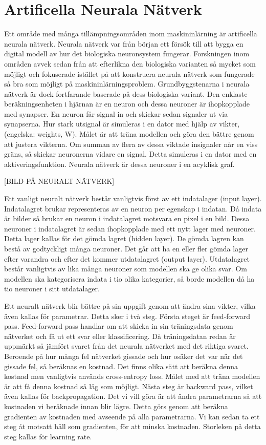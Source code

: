 \documentclass[]{kththesis}
\begin{document}
\section{Artificella Neurala Nätverk}
Ett område med många tillämpningsområden inom maskininlärning är artificella neurala nätverk. Neurala nätverk var från början ett försök till att bygga en digital modell av hur det biologiska neuronsystem fungerar. Forskningen inom områden avvek sedan från att efterlikna den biologiska varianten så mycket som möjligt och fokuserade istället på att konstruera neurala nätverk som fungerade så bra som möjligt på maskininlärningsproblem. Grundbyggstenarna i neurala nätverk är dock fortfarande baserade på dess biologiska variant. Den enklaste beräkningsenheten i hjärnan är en neuron och dessa neuroner är ihopkopplade med synapser. En neuron får signal in och skickar sedan signaler ut via synapserna. Hur stark utsignal är simuleras i en dator med hjälp av vikter, (engelska: weights, W). Målet är att träna modellen och göra den bättre genom att justera vikterna. Om summan av flera av dessa viktade insignaler når en viss gräns, så skickar neuronerna vidare en signal. Detta simuleras i en dator med en aktiveringsfunktion. Neurala nätverk är dessa neuroner i en acyklisk graf.
  

[BILD PÅ NEURALT NÄTVERK]

Ett vanligt neuralt nätverk består vanligtvis först av ett indatalager (input layer). Indatalagret brukar representeras av en neuron per egenskap i indatan. Då indata är bilder så brukar en neuron i indatalagret motsvara en pixel i en bild. Dessa neuroner i indatalagret är sedan ihopkopplade med ett nytt lager med neuroner. Detta lager kallas för det gömda lagret (hidden layer). De gömda lagren kan bestå av godtyckligt många neuroner. Det går att ha en eller fler gömda lager efter varandra och efter det kommer utdatalagret (output layer). Utdatalagret består vanligtvis av lika många neuroner som modellen ska ge olika svar. Om modellen ska kategorisera indata i tio olika kategorier, så borde modellen då ha tio neuroner i sitt utdatalager.

Ett neuralt nätverk blir bättre på sin uppgift genom att ändra sina vikter, vilka även kallas för parametrar. Detta sker i två steg. Första steget är feed-forward pass. Feed-forward pass handlar om att skicka in sin träningsdata genom nätverket och få ut ett svar eller klassificering. Då träningsdatan redan är uppmärkt så jämfört svaret från det neurala nätverket med det riktiga svaret. Beroende på hur många fel nätverket gissade och hur osäker det var när det gissade fel, så beräknas en kostnad. Det finns olika sätt att beräkna denna kostnad men vanligtvis används cross-entropy loss. Målet med att träna modellen är att få denna kostnad så låg som möjligt. Nästa steg är backward pass, vilket även kallas för backpropagation. Det vi vill göra är att ändra parametrarna så att kostnaden vi beräknade innan blir lägre. Detta görs genom att beräkna gradienten av kostnaden med avseende på alla parametrarna. Vi kan sedan ta ett steg åt motsatt håll som gradienten, för att minska kostnaden. Storleken på detta steg kallas för learning rate.
\end{document}
